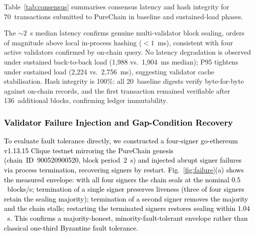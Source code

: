 \documentclass[conference]{IEEEtran}
\begin{document}
Table~\ref{tab:consensus} summarises consensus latency and
hash integrity for 70~transactions submitted to PureChain
in baseline and sustained-load phases.

\begin{table}[!t]
\centering
\caption{PureChain PoA$^2$ consensus latency (ms) and hash
integrity. \textcolor{black}{Active signer set recovered from
block-seal attribution; signer rotation observed (3 of 4 signers in recent blocks).}
Blocks~1{,}012{,}544--1{,}012{,}680.}
\label{tab:consensus}
\end{table}

The ${\sim}2$~s median latency confirms genuine
multi-validator block sealing, orders of magnitude
above local in-process hashing ($<1$~ms), consistent
with four active validators confirmed by on-chain query.
No latency degradation is observed under sustained
back-to-back load (1{,}988 vs.\ 1{,}904~ms median);
P95 tightens under sustained load (2{,}224 vs.\
2{,}756~ms), suggesting validator cache stabilisation.
Hash integrity is 100\%: all 20~baseline digests verify
byte-for-byte against on-chain records, and the first
transaction remained verifiable after 136~additional
blocks, confirming ledger immutability.

\textcolor{black}{\subsubsection{Validator Failure Injection and Gap-Condition Recovery}
To evaluate fault tolerance directly, we constructed a
four-signer go-ethereum v1.13.15 Clique testnet mirroring
the PureChain genesis (chain~ID~900520900520, block
period~2~s) and injected abrupt signer failures via
process termination, recovering signers by restart.
Fig.~\ref{fig:failure}(a) shows the measured envelope:
with all four signers the chain seals at the nominal
$0.5$~blocks/s; termination of a single signer preserves
liveness (three of four signers retain the sealing
majority); termination of a second signer removes the
majority and the chain stalls; restarting the terminated
signers restores sealing within $1.04$~s. This confirms a
majority-honest, minority-fault-tolerant envelope
rather than classical one-third Byzantine fault tolerance.}
\end{document}
